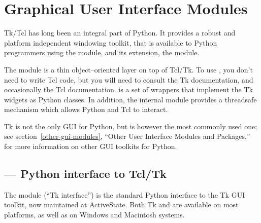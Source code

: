\chapter{Graphical User Interface Modules \label{gui}}


Tk/Tcl has long been an integral part of Python.  It provides a robust
and platform independent windowing toolkit, that is available to
Python programmers using the  module, and its
extension, the  module.

The  module is a thin object--oriented layer on top of
Tcl/Tk. To use , you don't need to write Tcl code,
but you will need to consult the Tk documentation, and occasionally
the Tcl documentation.   is a set of wrappers that
implement the Tk widgets as Python classes.  In addition, the internal
module  provides a threadsafe mechanism which allows
Python and Tcl to interact.

Tk is not the only GUI for Python, but is however the most commonly
used one; see section~\ref{other-gui-modules}, ``Other User Interface
Modules and Packages,'' for more information on other GUI toolkits for
Python.


\localmoduletable


\section{ ---
         Python interface to Tcl/Tk}


The  module (``Tk interface'') is the standard Python
interface to the Tk GUI toolkit, now maintained at ActiveState.  Both
Tk and  are available on most \UNIX{} platforms, as well
as on Windows and Macintosh systems.

